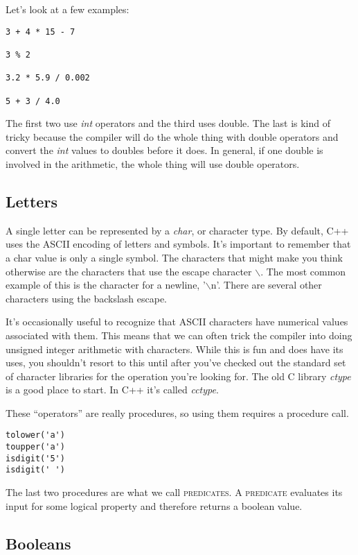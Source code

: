 \documentclass[]{tufte-handout}
\begin{document}
Let's look at a few examples:
\begin{verbatim}
3 + 4 * 15 - 7

3 % 2

3.2 * 5.9 / 0.002

5 + 3 / 4.0 
\end{verbatim}
The first two use \textit{int} operators and the third uses double.  The last is kind of tricky because the compiler will do the whole thing with double operators and convert the \textit{int} values to doubles before it does.  In general, if one double is involved in the arithmetic, the whole thing will use double operators.

\subsection{Letters}

A single letter can be represented by a \textit{char}, or character type.  By default, C++ uses the ASCII encoding of letters and symbols. It's important to remember that a char value is only a single symbol.  The characters that might make you think otherwise are the characters that use the escape character $\backslash$.  The most common example of this is the character for a newline, '$\backslash$n'. There are several other characters using the backslash escape.  

It's occasionally useful to recognize that ASCII characters have numerical values associated with them. This means that we can often trick the compiler into doing unsigned integer arithmetic with characters.   While this is fun and does have its uses, you shouldn't resort to this until after you've checked out the standard set of character libraries for the operation you're looking for. The old C library \textit{ctype} is a good place to start. In C++ it's called \textit{cctype}. 

These ``operators'' are really procedures, so using them requires a procedure call.
\begin{verbatim}
tolower('a')
toupper('a')
isdigit('5')
isdigit(' ')
\end{verbatim}
The last two procedures are what we call \textsc{predicates}. A \textsc{predicate} evaluates its input for some logical property and therefore returns a boolean value.

\subsection{Booleans}
\end{document}
